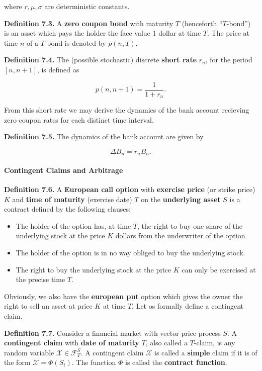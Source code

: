 \documentclass[
]{article}
\providecommand{\tightlist}{%
  \setlength{\itemsep}{0pt}\setlength{\parskip}{0pt}}
\begin{document}
where \(r,\mu,\sigma\) are deterministic constants.

\textbf{Definition 7.3.} A \textbf{zero coupon bond} with maturity \(T\)
(henceforth ``\(T\)-bond'') is an asset which pays the holder the face
value 1 dollar at time \(T\). The price at time \(n\) of a \(T\)-bond is
denoted by \(p(n,T)\).

\textbf{Definition 7.4.} The (possible stochastic) discrete
\textbf{short rate} \(r_n\), for the period \([n,n+1]\), is defined as

\[
p(n,n+1)=\frac{1}{1+ r_n}.
\]

From this short rate we may derive the dynamics of the bank account
recieving zero-coupon rates for each distinct time interval.

\textbf{Definition 7.5.} The dynamics of the bank account are given by

\[
\Delta B_n=r_n B_n.
\]

\hypertarget{contingent-claims-and-arbitrage}{%
\paragraph{Contingent Claims and
Arbitrage}\label{contingent-claims-and-arbitrage}}

\textbf{Definition 7.6.} A \textbf{European call option} with
\textbf{exercise price} (or strike price) \(K\) and \textbf{time of
maturity} (exercise date) \(T\) on the \textbf{underlying asset} \(S\)
is a contract defined by the following clauses:

\begin{itemize}
\tightlist
\item
  The holder of the option has, at time \(T\), the right to buy one
  share of the underlying stock at the price \(K\) dollars from the
  underwriter of the option.
\item
  The holder of the option is in no way obliged to buy the underlying
  stock.
\item
  The right to buy the underlying stock at the price \(K\) can only be
  exercised at the precise time \(T\).
\end{itemize}

Obviously, we also have the \textbf{european put} option which gives the
owner the right to sell an asset at price \(K\) at time \(T\). Let os
formally define a contingent claim.

\textbf{Definition 7.7.} Consider a financial market with vector price
process \(S\). A \textbf{contingent claim} with \textbf{date of
maturity} \(T\), also called a \(T\)-claim, is any random variable
\(\mathcal{X}\in\mathcal{F}_T^S\). A contingent claim \(\mathcal{X}\) is
called a \textbf{simple} claim if it is of the form
\(\mathcal{X} = \Phi(S_t)\). The function \(\Phi\) is called the
\textbf{contract function}.
\end{document}
